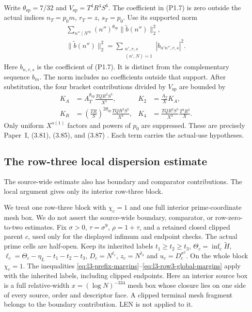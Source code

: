 Write $\theta_{\mathrm{sp}}=7/32$ and
$V_{\mathrm{sp}}=T^4R^4S^6$.
The coefficient in (P1.7) is zero outside the actual indices
$n_T=p_0m$, $r_T=z$, $s_T=p_0$.
Use its supported norm
\begin{equation}\label{eq:l3-supported-norm}
\begin{gathered}
 \sum_{n''\mid N^\infty}(n'')^{\theta_{\mathrm{sp}}}
                \|\widetilde b(n'')\|_2^2,\\
 \|\widetilde b(n'')\|_2^2
 =\sum_{\substack{n',r,s\\(n',N)=1}}|b_{n'n'',r,s}|^2.
\end{gathered}
\end{equation}
Here $b_{n,r,s}$ is the coefficient of (P1.7).
It is distinct from the complementary sequence $b_m$.
The norm includes no coefficients outside that support.
After substitution, the four bracket contributions divided by
$V_{\mathrm{sp}}$ are bounded by
\begin{equation}\label{eq:l3-four-spectral-terms}
\begin{aligned}
 K_A&=A_T^{\theta_{\mathrm{sp}}}\frac{TQR^2S^5}{X^2},
 &K_2&=\frac{A_T}{X}K_A,\\
 K_R&=\left(\frac{TR}{S}\right)^{2\theta_{\mathrm{sp}}}
                              \frac{TQR^2S^5}{X^2},
 &K_4&=\frac{TQR^2S^5}{X^2}\frac{T^2R^2}{X}.
\end{aligned}
\end{equation}
Only uniform $X^{o(1)}$ factors and powers of $p_0$ are suppressed.
These are precisely Paper~I, (3.81), (3.85), and (3.87)
\cite[(3.69), (3.81)--(3.87)]{PaperI}.
Each term carries the actual-use hypotheses.
\subsection{The row-three local dispersion estimate}\label{subsec:l3-local-row3}

The source-wide estimate also has boundary and comparator contributions.
The local argument gives only its interior row-three block.

We treat one row-three block with $\chi_c=1$ and one full
interior prime-coordinate mesh box. We do not assert the source-wide
boundary, comparator, or row-zero-to-two estimates.
Fix $\sigma>0$, $\tau=\sigma^9$, $\rho=1+\tau$, and a retained
closed clipped parent $c$, used only for the displayed infimum and endpoint
checks. The actual prime cells are half-open. Keep its inherited labels
$t_1\ge t_2\ge t_3$,
$\Theta_c=\inf_c\widetilde H$, $\ell_c=\Theta_c-\eta_L-t_1-t_2-t_3$,
$D_c=N^{\ell_c}$, $z_c=N^{t_3}$ and $u_c=D_c^{\sigma^2}$.
On the whole block $\chi_c=1$. The inequalities
\eqref{eq:l3-prefix-margins}--\eqref{eq:l3-row3-global-margins}
apply with the inherited labels, including clipped endpoints.
Here an interior source box is a full relative-width
$x=(\log N)^{-334}$ mesh box whose closure lies on one side of every
source, order and descriptor face. A clipped terminal mesh fragment
belongs to the boundary contribution.
LEN is not applied to it.

